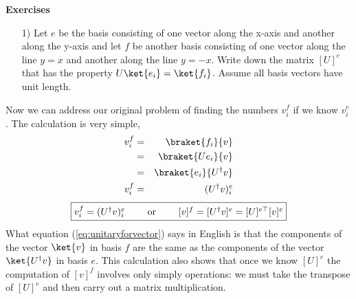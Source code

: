 \begin{flushleft}\textbf{Exercises}\end{flushleft}
\begin{itemize}\item[1)] Let $e$ be the basis consisting of one vector along the x-axis and another along the y-axis and let $f$ be another basis consisting of one vector along the line $y = x$ and another along the line $y = -x$.  Write down the matrix $[U]^e$ that has the property $U\ket{e_i}=\ket{f_i}$.  Assume all basis vectors have unit length.
\end{itemize}
Now we can address our original problem of finding the numbers $v_i^f$ if we know $v_i^e$.  The calculation is very simple,
\begin{eqnarray*}
v^f_i &=& \braket{f_i}{v}\\
      &=& \braket{Ue_i}{v}\\
      &=& \braket{e_i}{U^{\dag}v}\\
v^f_i &=& (U^{\dag}v)^e_i
\end{eqnarray*}
\begin{equation}\label{eq:unitaryforvector}
\framebox{$v^f_i = (U^{\dag}v)^e_i$ \qquad or \qquad $[v]^f = [U^{\dag}v]^e = [U]^{e\top}[v]^e$}
\end{equation}
What equation (\ref{eq:unitaryforvector}) says in English is that the components of the vector $\ket{v}$ in basis $f$ are the same as the components of the vector $\ket{U^{\dag}v}$ in basis $e$.  This calculation also shows that once we know $[U]^e$ the computation of $[v]^f$ involves only simply operations: we must take the transpose of $[U]^e$ and then carry out a matrix multiplication.

